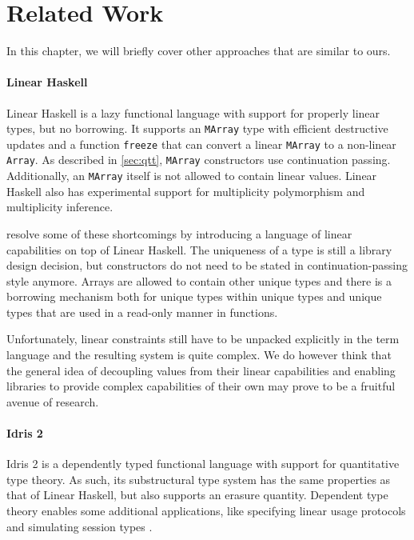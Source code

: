 \chapter{Related Work}\label{sec:relatedwork}
In this chapter, we will briefly cover other approaches that are similar to ours.

\subsubsection{Linear Haskell}
Linear Haskell \citep{bernardy_linear_2018} is a lazy functional language with support for properly linear types, but no borrowing. It supports an \lstinline|MArray| type with efficient destructive updates and a function \lstinline|freeze| that can convert a linear \lstinline|MArray| to a non-linear \lstinline|Array|. As described in \cref{sec:qtt}, \lstinline|MArray| constructors use continuation passing. Additionally, an \lstinline|MArray| itself is not allowed to contain linear values. Linear Haskell also has experimental support for multiplicity polymorphism and multiplicity inference.

\cite{spiwack_linearly_2022} resolve some of these shortcomings by introducing a language of linear capabilities on top of Linear Haskell. The uniqueness of a type is still a library design decision, but constructors do not need to be stated in continuation-passing style anymore. Arrays are allowed to contain other unique types and there is a borrowing mechanism both for unique types within unique types and unique types that are used in a read-only manner in functions. 

Unfortunately, linear constraints still have to be unpacked explicitly in the term language and the resulting system is quite complex. We do however think that the general idea of decoupling values from their linear capabilities and enabling libraries to provide complex capabilities of their own may prove to be a fruitful avenue of research.

\subsubsection{Idris 2}
Idris 2 \citep{brady_idris_2021} is a dependently typed functional language with support for quantitative type theory. As such, its substructural type system has the same properties as that of Linear Haskell, but also supports an erasure quantity. Dependent type theory enables some additional applications, like specifying linear usage protocols and simulating session types \citep{honda_types_1993}.


